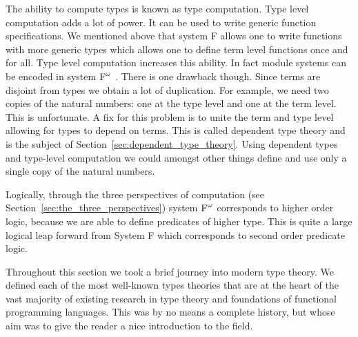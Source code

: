 The ability to compute types is known as type computation.  Type level
computation adds a lot of power.  It can be used to write generic
function specifications.  We mentioned above that system F allows one
to write functions with more generic types which allows one to define
term level functions once and for all.  Type level computation
increases this ability.  In fact module systems can be encoded in
system $\text{F}^\omega$ \cite{Shan:2006}.  There is one drawback though.  Since
terms are disjoint from types we obtain a lot of duplication.  For
example, we need two copies of the natural numbers: one at the type
level and one at the term level.  This is unfortunate.  A fix for this
problem is to unite the term and type level allowing for types to
depend on terms.  This is called dependent type theory and is the
subject of Section~\ref{sec:dependent_type_theory}.  Using dependent
types and type-level computation we could amongst other things define
and use only a single copy of the natural numbers.

Logically, through the three perspectives of computation (see
Section~\ref{sec:the_three_perspectives}) system $\text{F}^\omega$ corresponds to
higher order logic, because we are able to define predicates of higher
type.  This is quite a large logical leap forward from System F which
corresponds to second order predicate logic.

Throughout this section we took a brief journey into modern type
theory.  We defined each of the most well-known types theories that
are at the heart of the vast majority of existing research in type
theory and foundations of functional programming languages.  This was
by no means a complete history, but whose aim was to give the reader a
nice introduction to the field.
